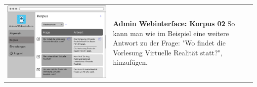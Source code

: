 \begin{tabular}{C{6cm}  L{7cm}}
    \includegraphics[width=\linewidth]{bilder/new vers. UI Design/Korpus/Admin Interface 02.png} & \textbf{Admin Webinterface: Korpus 02} \newline
    So kann man wie im Beispiel eine weitere Antwort zu der Frage: "Wo findet die Vorlesung Virtuelle
    Realität statt?", hinzufügen.
\end{tabular}

